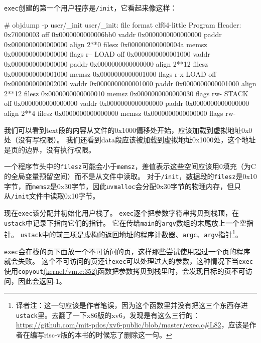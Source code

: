 \texttt{exec}创建的第一个用户程序是\texttt{/init}，它看起来像这样：
\begin{blacklisting}
    # objdump -p user/_init
    user/_init:     file format elf64-little
    Program Header:
    0x70000003 off    0x0000000000006bb0 vaddr 0x0000000000000000
                                           paddr 0x0000000000000000 align 2**0
             filesz 0x000000000000004a memsz 0x0000000000000000 flags r--
        LOAD off    0x0000000000001000 vaddr 0x0000000000000000
                                           paddr 0x0000000000000000 align 2**12
             filesz 0x0000000000001000 memsz 0x0000000000001000 flags r-x
        LOAD off    0x0000000000002000 vaddr 0x0000000000001000
                                           paddr 0x0000000000001000 align 2**12
             filesz 0x0000000000000010 memsz 0x0000000000000030 flags rw-
       STACK off    0x0000000000000000 vaddr 0x0000000000000000
                                           paddr 0x0000000000000000 align 2**4
             filesz 0x0000000000000000 memsz 0x0000000000000000 flags rw-
\end{blacklisting}

我们可以看到text段的内容从文件的0x1000偏移处开始，应该加载到虚拟地址0x0处（没有写权限）。
我们还看到data段应该被加载到虚拟地址0x1000处，这个地址是页的边界，没有执行权限。

一个程序节头中的\texttt{filesz}可能会小于\texttt{memsz}，差值表示这些空间应该用0填充（为C的全局变量预留空间）而不是从文件中读取。
对于\texttt{/init}，数据段的\texttt{filesz}是0x10字节，而\texttt{memsz}是0x30字节，因此\texttt{uvmalloc}会分配0x30字节的物理内存，但只从\texttt{/init}文件中读取0x10字节。

现在\texttt{exec}该分配并初始化用户栈了。
\texttt{exec}逐个把参数字符串拷贝到栈顶，在\texttt{ustack}中记录下指向它们的指针。
它在传给\texttt{main}的\texttt{argv}数组的末尾放上一个空指针。
\texttt{ustack}中的前三项是虚构的返回地址的程序计数器、\texttt{argc}、\texttt{argv}指针\footnote{译者注：这一句应该是作者笔误，因为这个函数里并没有把这三个东西存进\texttt{ustack}里。去翻了一下x86版的xv6，发现是有这么三行的：\url{https://github.com/mit-pdos/xv6-public/blob/master/exec.c\#L82}，应该是作者在编写risc-v版的本书的时候忘了删除这一句。}。

\texttt{exec}会在栈的页下面放一个不可访问的页，这样那些尝试使用超过一个页的程序就会失败。
这个不可访问的页还让\texttt{exec}可以处理过大的参数，这种情况下当\texttt{exec}使用\texttt{copyout}\href{https://github.com/mit-pdos/xv6-riscv/blob/riscv//kernel/vm.c#L352}{(kernel/vm.c:352)}函数把参数拷贝到栈里时，会发现目标的页不可访问，因此会返回-1。

